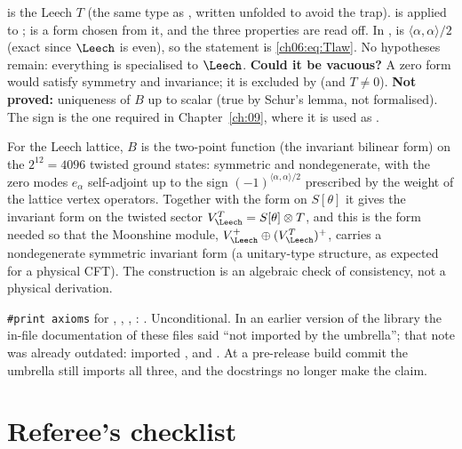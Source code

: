 \begin{dictionary}
 is the Leech $T$ (the same type as , written unfolded to avoid the
 trap).   is  applied to
;  is a form chosen from it, and the three properties are read
off.  In ,  is $\langle\alpha,\alpha\rangle/2$ (exact since
$\Leech$ is even), so the statement is \eqref{ch06:eq:Tlaw}.  No hypotheses remain: everything is
specialised to $\Leech$.  \textbf{Could it be vacuous?}  A zero form would satisfy symmetry and
invariance; it is excluded by  (and $T\ne0$).  \textbf{Not proved:}
uniqueness of $B$ up to scalar (true by Schur's lemma, not formalised).  The sign is the one
required in Chapter~\ref{ch:09}, where it is used as .
\end{dictionary}

\begin{physics}
For the Leech lattice, $B$ is the two-point function (the invariant bilinear form) on the $2^{12}=4096$ twisted ground states: symmetric and nondegenerate, with the zero modes $e_\alpha$ self-adjoint up to the sign $(-1)^{\langle\alpha,\alpha\rangle/2}$ prescribed by the weight of the lattice vertex operators. Together with the form on $S[\theta]$ it gives the invariant form on the twisted sector $V_\Leech^T=S[\theta]\otimes T$, and this is the form needed so that the Moonshine module, $V_\Leech^+\oplus(V_\Leech^T)^+$, carries a nondegenerate symmetric invariant form (a unitary-type structure, as expected for a physical CFT). The construction is an algebraic check of consistency, not a physical derivation.
\end{physics}
\begin{status}
\texttt{\#print axioms} for , , ,
: .  Unconditional.  In an earlier version of the library the in-file
documentation of these files said ``not imported by the umbrella''; that note was already outdated:
 imported ,  and
. At a pre-release build commit the umbrella still imports all three, and the docstrings no longer
make the claim.
\end{status}

\section{Referee's checklist}\label{ch06:sec:checklist}

